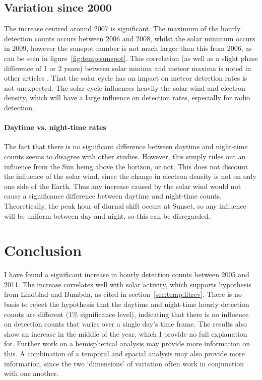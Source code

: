 \subsection{Variation since 2000}
The increase centred around 2007 is significant. The maximum of the hourly detection counts occurs between 2006 and 2008, whilst the solar minimum occurs in 2009, however the sunspot number is not much larger than this from 2006, as can be seen in figure~\ref{fig:temp:sunspot}. This correlation (as well as a slight phase difference of 1 or 2 years) between solar minima and meteor maxima is noted in other articles \cite{lindblad}. That the solar cycle has an impact on meteor detection rates is not unexpected. The solar cycle influences heavily the solar wind and electron density, which will have a large influence on detection rates, especially for radio detection.
\paragraph{Daytime vs. night-time rates\\}
The fact that there is no significant difference between daytime and night-time counts seems to disagree with other studies. However, this simply rules out an influence from the Sun being above the horizon, or not. This does not discount the influence of the solar wind, since the change in electron density is not on only one side of the Earth. Thus any increase caused by the solar wind would not cause a significance difference between daytime and night-time counts. Theoretically, the peak hour of diurnal shift occurs at Sunset, so any influence will be uniform between day and night, so this can be disregarded.
\section{Conclusion}
I have found a significant increase in hourly detection counts between 2005 and 2011. The increase correlates well with solar activity, which supports hypothesis from Lindblad and Bumbda, as cited in section~\ref{sec:temp:litrev}. There is no basis to reject the hypothesis that the daytime and night-time hourly detection counts are different (1\% significance level), indicating that there is no influence on detection counts that varies over a single day's time frame. The results also show an increase in the middle of the year, which I provide no full explanation for. Further work on a hemispherical analysis may provide more information on this. A combination of a temporal and spacial analysis may also provide more information, since the two `dimensions' of variation often work in conjunction with one another.